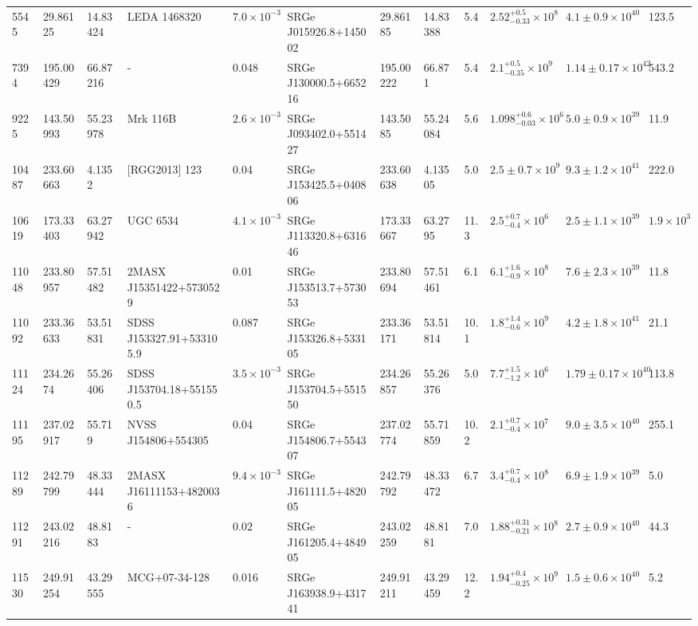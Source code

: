 \begin{longtable}{llllllllllll}
5545 & 29.86125 & 14.83424 & LEDA 1468320 & $7.0\times10^{-3}$ & SRGe J015926.8+145002 & 29.86185 & 14.83388 & 5.4 & $2.52^{+0.5}_{-0.33}\times10^{8}$ & $4.1\pm0.9\times10^{40}$ & 123.5 \\
7394 & 195.00429 & 66.87216 & - & 0.048 & SRGe J130000.5+665216 & 195.00222 & 66.871 & 5.4 & $2.1^{+0.5}_{-0.35}\times10^{9}$ & $1.14\pm0.17\times10^{42}$ & 543.2 \\
9225 & 143.50993 & 55.23978 & Mrk  116B & $2.6\times10^{-3}$ & SRGe J093402.0+551427 & 143.5085 & 55.24084 & 5.6 & $1.098^{+0.6}_{-0.03}\times10^{6}$ & $5.0\pm0.9\times10^{39}$ & 11.9 \\
10487 & 233.60663 & 4.1352 & [RGG2013] 123 & 0.04 & SRGe J153425.5+040806 & 233.60638 & 4.13505 & 5.0 & $2.5\pm0.7\times10^{9}$ & $9.3\pm1.2\times10^{41}$ & 222.0 \\
10619 & 173.33403 & 63.27942 & UGC  6534 & $4.1\times10^{-3}$ & SRGe J113320.8+631646 & 173.33667 & 63.2795 & 11.3 & $2.5^{+0.7}_{-0.4}\times10^{6}$ & $2.5\pm1.1\times10^{39}$ & $1.9\times10^{3}$ \\
11048 & 233.80957 & 57.51482 & 2MASX J15351422+5730529 & 0.01 & SRGe J153513.7+573053 & 233.80694 & 57.51461 & 6.1 & $6.1^{+1.6}_{-0.9}\times10^{8}$ & $7.6\pm2.3\times10^{39}$ & 11.8 \\
11092 & 233.36633 & 53.51831 & SDSS J153327.91+533105.9 & 0.087 & SRGe J153326.8+533105 & 233.36171 & 53.51814 & 10.1 & $1.8^{+1.4}_{-0.6}\times10^{9}$ & $4.2\pm1.8\times10^{41}$ & 21.1 \\
11124 & 234.2674 & 55.26406 & SDSS J153704.18+551550.5 & $3.5\times10^{-3}$ & SRGe J153704.5+551550 & 234.26857 & 55.26376 & 5.0 & $7.7^{+1.5}_{-1.2}\times10^{6}$ & $1.79\pm0.17\times10^{40}$ & 113.8 \\
11195 & 237.02917 & 55.719 & NVSS J154806+554305 & 0.04 & SRGe J154806.7+554307 & 237.02774 & 55.71859 & 10.2 & $2.1^{+0.7}_{-0.4}\times10^{7}$ & $9.0\pm3.5\times10^{40}$ & 255.1 \\
11289 & 242.79799 & 48.33444 & 2MASX J16111153+4820036 & $9.4\times10^{-3}$ & SRGe J161111.5+482005 & 242.79792 & 48.33472 & 6.7 & $3.4^{+0.7}_{-0.4}\times10^{8}$ & $6.9\pm1.9\times10^{39}$ & 5.0 \\
11291 & 243.02216 & 48.8183 & - & 0.02 & SRGe J161205.4+484905 & 243.02259 & 48.8181 & 7.0 & $1.88^{+0.31}_{-0.21}\times10^{8}$ & $2.7\pm0.9\times10^{40}$ & 44.3 \\
11530 & 249.91254 & 43.29555 & MCG+07-34-128 & 0.016 & SRGe J163938.9+431741 & 249.91211 & 43.29459 & 12.2 & $1.94^{+0.4}_{-0.25}\times10^{9}$ & $1.5\pm0.6\times10^{40}$ & 5.2 \\

\end{longtable}
